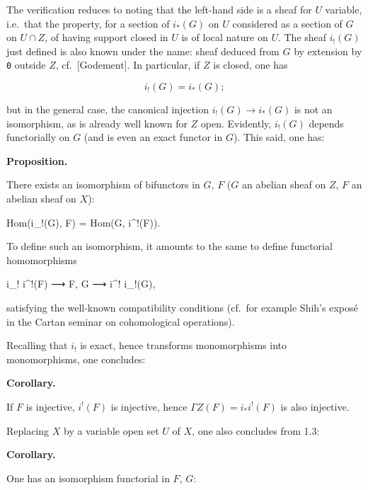 \documentclass[
  11pt,
  a4paper,
]{book}
\newenvironment{Shaded}{}{}
\newcommand{\NormalTok}[1]{#1}
\begin{document}
The verification reduces to noting that the left-hand side is a sheaf
for \(U\) variable, i.e.~that the property, for a section of
\(i_{*}(G)\) on \(U\) considered as a section of \(G\) on \(U \cap Z\),
of having support closed in \(U\) is of local nature on \(U\). The sheaf
\(i_{!}(G)\) just defined is also known under the name: sheaf deduced
from \(G\) by extension by \texttt{0} outside \(Z\), cf.~{[}Godement{]}.
In particular, if \(Z\) is closed, one has

\[ i_{!}(G) = i_{*}(G); \]

but in the general case, the canonical injection
\(i_{!}(G) \to i_{*}(G)\) is not an isomorphism, as is already well
known for \(Z\) open. Evidently, \(i_{!}(G)\) depends functorially on
\(G\) (and is even an exact functor in \(G\)). This said, one has:

\textbf{Proposition.}

There exists an isomorphism of bifunctors in \(G\), \(F\) (\(G\) an
abelian sheaf on \(Z\), \(F\) an abelian sheaf on \(X\)):

\begin{Shaded}
\begin{Highlighting}[]
\NormalTok{Hom(i\_!(G), F) = Hom(G, i\^{}!(F)).}
\end{Highlighting}
\end{Shaded}

To define such an isomorphism, it amounts to the same to define
functorial homomorphisms

\begin{Shaded}
\begin{Highlighting}[]
\NormalTok{i\_! i\^{}!(F) ⟶ F, G ⟶ i\^{}! i\_!(G),}
\end{Highlighting}
\end{Shaded}

satisfying the well-known compatibility conditions (cf.~for example
Shih's exposé in the Cartan seminar on cohomological operations).

Recalling that \(i_{!}\) is exact, hence transforms monomorphisms into
monomorphisms, one concludes:

\textbf{Corollary.}

If \(F\) is injective, \(i^{!}(F)\) is injective, hence
\(\Gamma Z(F) = i_{*} i^{!}(F)\) is also injective.

Replacing \(X\) by a variable open set \(U\) of \(X\), one also
concludes from 1.3:

\textbf{Corollary.}

One has an isomorphism functorial in \(F\), \(G\):
\end{document}
